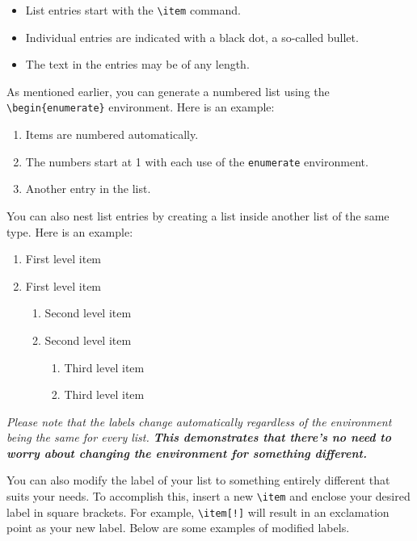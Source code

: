 {\begin{itemize}
  \item List entries start with the \verb|\item| command.
  \item Individual entries are indicated with a black dot, a so-called bullet.
  \item The text in the entries may be of any length.
\end{itemize}

As mentioned earlier, you can generate a numbered list using the \verb|\begin{enumerate}| environment. Here is an example:

\begin{enumerate}
  \item Items are numbered automatically.
  \item The numbers start at 1 with each use of the \verb|enumerate| environment.
  \item Another entry in the list.
\end{enumerate}

You can also nest list entries by creating a list inside another list of the same type. Here is an example:

\begin{enumerate}
    \item First level item
    \item First level item
    \begin{enumerate}
        \item Second level item
        \item Second level item
    \begin{enumerate}
        \item Third level item
        \item Third level item
    \end{enumerate}
    \end{enumerate}
\end{enumerate}

\begin{block}[tip]
\textit{Please note that the labels change automatically regardless of the environment being the same for every list. \textbf{This demonstrates that there's no need to worry about changing the environment for something different.}}
\end{block}

You can also modify the label of your list to something entirely different that suits your needs. To accomplish this, insert a new \verb|\item| and enclose your desired label in square brackets. For example, \verb|\item[!]| will result in an exclamation point as your new label. Below are some examples of modified labels.

}
